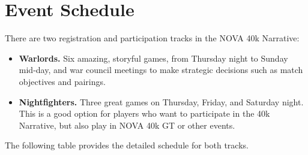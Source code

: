 \documentclass{novanarrative}
\begin{document}
\chapter{Event Schedule}

There are two registration and participation tracks in the NOVA 40k Narrative:
\begin{itemize}
\item \textbf{Warlords.} Six amazing, storyful games, from Thursday
  night to Sunday mid-day, and war council meetings to make strategic
  decisions such as match objectives and pairings.

\item \textbf{Nightfighters.} Three great games on Thursday, Friday,
  and Saturday night.  This is a good option for players who want to
  participate in the 40k Narrative, but also play in NOVA 40k GT or
  other events.
\end{itemize}

The following table provides the detailed schedule for both tracks.
\end{document}

